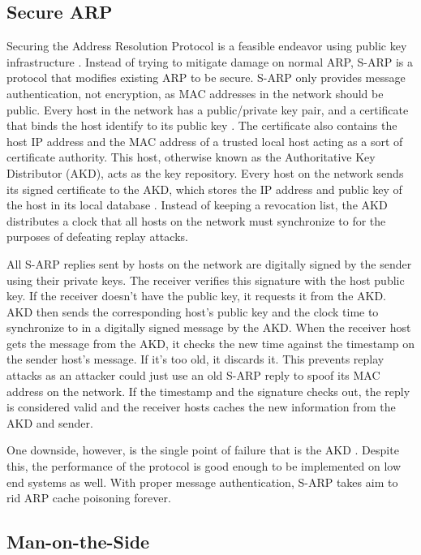 \documentclass[journal]{IEEEtran}
\begin{document}
\subsection{Secure ARP}

Securing the Address Resolution Protocol is a feasible endeavor using public key infrastructure \cite{SARP}. Instead of trying to mitigate damage on normal ARP, S-ARP is a protocol that modifies existing ARP to be secure. S-ARP only provides message authentication, not encryption, as MAC addresses in the network should be public. Every host in the network has a public/private key pair, and a certificate that binds the host identify to its public key \cite{SARP}. The certificate also contains the host IP address and the MAC address of a trusted local host acting as a sort of certificate authority. This host, otherwise known as the Authoritative Key Distributor (AKD), acts as the key repository. Every host on the network sends its signed certificate to the AKD, which stores the IP address and public key of the host in its local database \cite{SARP}. Instead of keeping a revocation list, the AKD distributes a clock that all hosts on the network must synchronize to for the purposes of defeating replay attacks.

All S-ARP replies sent by hosts on the network are digitally signed by the sender using their private keys. The receiver verifies this signature with the host public key. If the receiver doesn't have the public key, it requests it from the AKD. AKD then sends the corresponding host's public key and the clock time to synchronize to in a digitally signed message by the AKD. When the receiver host gets the message from the AKD, it checks the new time against the timestamp on the sender host's message. If it's too old, it discards it. This prevents replay attacks as an attacker could just use an old S-ARP reply to spoof its MAC address on the network. If the timestamp and the signature checks out, the reply is considered valid and the receiver hosts caches the new information from the AKD and sender.

One downside, however, is the single point of failure that is the AKD \cite{SARP}. Despite this, the performance of the protocol is good enough to be implemented on low end systems as well. With proper message authentication, S-ARP takes aim to rid ARP cache poisoning forever.

\subsection{Man-on-the-Side}
	
\end{document}
